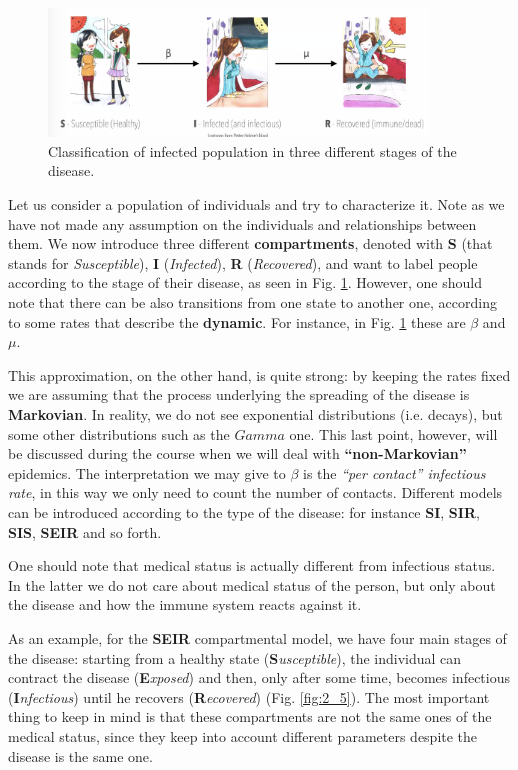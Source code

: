 \documentclass[../main/main.tex]{subfiles}
\begin{document}
\begin{figure}[!b]
\centering
\includegraphics[width=0.9\textwidth]{../lessons/image/02/1_classification.png}
\caption{\label{fig:1_classification} Classification of infected population in three different stages of the disease.}
\end{figure}

Let us consider a population of individuals and try to characterize it. Note as we have not made any assumption on the individuals and relationships between them. We now introduce three different \textbf{compartments}, denoted with \textbf{S} (that stands for \textit{Susceptible}), \textbf{I} (\textit{Infected}), \textbf{R} (\textit{Recovered}), and want to label people according to the stage of their disease, as seen in Fig. \ref{fig:1_classification}. However, one should note that there can be also transitions from one state to another one, according to some rates that describe the \textbf{dynamic}. For instance, in Fig. \ref{fig:1_classification} these are $\beta$ and $\mu$.

This approximation, on the other hand, is quite strong: by keeping the rates fixed we are assuming that the process underlying the spreading of the disease is \textbf{Markovian}. In reality, we do not see exponential distributions (i.e. decays), but some other distributions such as the $Gamma$ one. This last point, however, will be discussed during the course when we will deal with \textbf{“non-Markovian”} epidemics. The interpretation we may give to $\beta$ is the \textit{“per contact” infectious rate}, in this way we only need to count the number of contacts.
Different models can be introduced according to the type of the disease: for instance \textbf{SI}, \textbf{SIR}, \textbf{SIS}, \textbf{SEIR} and so forth.


One should note that medical status is actually different from infectious status. In the latter we do not care about medical status of the person, but only about the disease and how the immune system reacts against it.

As an example, for the \textbf{SEIR} compartmental model, we have four main stages of the disease: starting from a healthy state (\textbf{S}\textit{usceptible}), the individual can contract the disease (\textbf{E}\textit{xposed}) and then, only after some time, becomes infectious (\textbf{I}\textit{nfectious}) until he recovers (\textbf{R}\textit{ecovered}) (Fig. \ref{fig:2_5}). The most important thing to keep in mind is that these compartments are not the same ones of the medical status, since they keep into account different parameters despite the disease is the same one.
\end{document}
